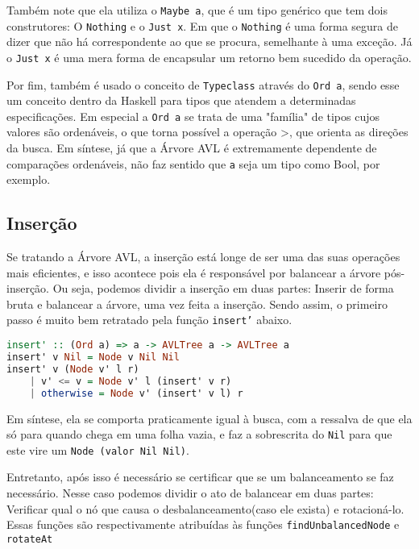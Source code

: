 Também note que ela utiliza o \texttt{Maybe a}, que é um tipo genérico que tem dois construtores: O \texttt{Nothing} e o \texttt{Just x}. Em que o \texttt{Nothing} é uma forma segura de dizer que não há correspondente ao que se procura, semelhante à uma exceção. Já o \texttt{Just x} é uma mera forma de encapsular um retorno bem sucedido da operação.

Por fim, também é usado o conceito de \texttt{Typeclass} através do \texttt{Ord a}, sendo esse um conceito dentro da Haskell para tipos que atendem a determinadas especificações. Em especial a \texttt{Ord a} se trata de uma "família" de tipos cujos valores são ordenáveis, o que torna possível a operação >, que orienta as direções da busca. Em síntese, já que a Árvore AVL é extremamente dependente de comparações ordenáveis, não faz sentido que \texttt{a} seja um tipo como Bool, por exemplo.
\subsection{Inserção}

Se tratando a Árvore AVL, a inserção está longe de ser uma das suas operações mais eficientes, e isso acontece pois ela é responsável por balancear a árvore pós-inserção. Ou seja, podemos dividir a inserção em duas partes: Inserir de forma bruta e balancear a árvore, uma vez feita a inserção. Sendo assim, o primeiro passo é muito bem retratado pela função \texttt{insert'} abaixo.

\begin{lstlisting}[language=haskell]
insert' :: (Ord a) => a -> AVLTree a -> AVLTree a
insert' v Nil = Node v Nil Nil
insert' v (Node v' l r)
    | v' <= v = Node v' l (insert' v r)
    | otherwise = Node v' (insert' v l) r
\end{lstlisting}

Em síntese, ela se comporta praticamente igual à busca, com a ressalva de que ela só para quando chega em uma folha vazia, e faz a sobrescrita do \texttt{Nil} para que este vire um \texttt{Node (valor Nil Nil)}.

Entretanto, após isso é necessário se certificar que se um balanceamento se faz necessário. Nesse caso podemos dividir o ato de balancear em duas partes: Verificar qual o nó que causa o desbalanceamento(caso ele exista) e rotacioná-lo. Essas funções são respectivamente atribuídas às funções \texttt{findUnbalancedNode} e \texttt{rotateAt}

